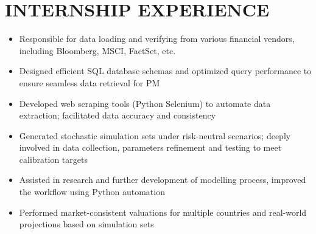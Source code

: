 \documentclass[classic]{resume}
\begin{document}
    \section{INTERNSHIP EXPERIENCE}
    \begin{itemize}
        \item Responsible for data loading and verifying from various financial vendors, including Bloomberg, MSCI, FactSet, etc.
        \item Designed efficient SQL database schemas and optimized query performance to ensure seamless data retrieval for PM
        \item Developed web scraping tools (Python Selenium) to automate data extraction; facilitated data accuracy and consistency
    \end{itemize}

    \begin{itemize}
        \item Generated stochastic simulation sets under risk-neutral scenarios; deeply involved in data collection, parameters refinement and testing to meet calibration targets
        \item Assisted in research and further development of modelling process, improved the workflow using Python automation
        \item Performed market-consistent valuations for multiple countries and real-world projections based on simulation sets
    \end{itemize}
\end{document}

